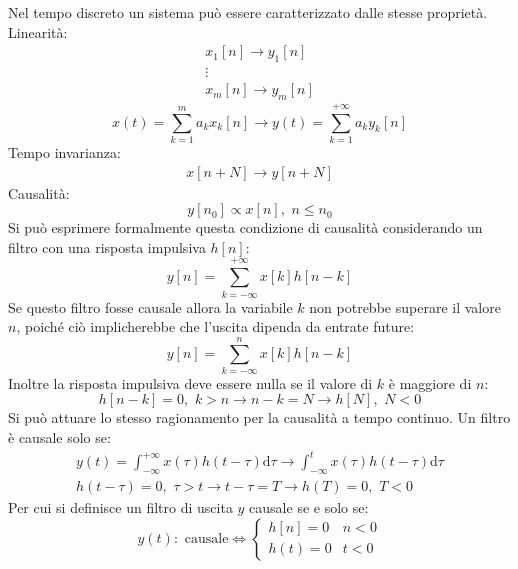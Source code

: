 \documentclass{article}
\newcommand{\df}{\mathrm{d}}
\numberwithin{equation}{subsection}
\begin{document}
Nel tempo discreto un sistema può essere caratterizzato dalle stesse proprietà. 
Linearità:
\begin{gather*}
    x_1[n]\to y_1[n]\\
    \vdots\\
    x_m[n]\to y_m[n]
\end{gather*}
\begin{equation}
    x(t)=\displaystyle\sum_{k=1}^{m}a_kx_k[n]\to y(t)=\displaystyle\sum_{k=1}^{+\infty}a_ky_k[n]
\end{equation}
Tempo invarianza:
\begin{gather}
    x[n+N]\to y[n+N]
\end{gather}
Causalità:
\begin{equation}
    y[n_0]\propto x[n],\,\, n\leq n_0
\end{equation}
Si può esprimere formalmente questa condizione di causalità considerando un filtro con una risposta impulsiva $h[n]$:
\begin{equation*}
    y[n]=\displaystyle\sum_{k=-\infty}^{+\infty}x[k]h[n-k]
\end{equation*} 
Se questo filtro fosse causale allora la variabile $k$ non potrebbe superare il valore $n$, poiché ciò implicherebbe che l'uscita dipenda da entrate future:
\begin{equation*}
    y[n]=\displaystyle\sum_{k=-\infty}^nx[k]h[n-k]
\end{equation*}
Inoltre la risposta impulsiva deve essere nulla se il valore di $k$ è maggiore di $n$:
\begin{equation*}
    h[n-k]=0,\,\, k>n\to{n-k=N}\to h[N],\,\, N<0
\end{equation*} 
Si può attuare lo stesso ragionamento per la causalità a tempo continuo. Un filtro è causale solo se:
\begin{gather*}
    y(t)=\displaystyle\int_{-\infty}^{+\infty}x(\tau)h(t-\tau)\df\tau\to \int_{-\infty}^{t}x(\tau)h(t-\tau)\df\tau\\
    h(t-\tau)=0,\,\, \tau>t\to{t-\tau=T}\to h(T)=0,\,\, T<0
\end{gather*}
Per cui si definisce un filtro di uscita $y$ causale se e solo se:
\begin{equation}
    y(t):\mbox{ causale}\iff \begin{cases}
        h[n]=0& n<0\\
        h(t)=0& t<0
    \end{cases}
\end{equation}
\end{document}
